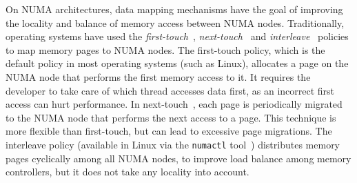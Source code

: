 On NUMA architectures, data mapping mechanisms have the goal of improving the locality and balance of memory access between NUMA nodes.
Traditionally, operating systems have used the \emph{first-touch}~\cite{Marchetti1995}, \emph{next-touch}~\cite{Lof2005} and \emph{interleave}~\cite{Kleen2004} policies to map memory pages to NUMA nodes.
The first-touch policy, which is the default policy in most operating systems (such as Linux), allocates a page on the NUMA node that performs the first memory access to it.
It requires the developer to take care of which thread accesses data
first, as an incorrect first access can hurt performance.
In next-touch~\cite{Lof2005}, each page is periodically migrated to the NUMA
node that performs the next access to a page. This technique is more flexible than first-touch,
but can lead to excessive page migrations.
The interleave policy (available in Linux via the \texttt{numactl}
tool~\cite{Kleen2004}) distributes memory pages cyclically among all NUMA nodes,
to improve load balance among memory controllers, but it does not take any locality into account.

